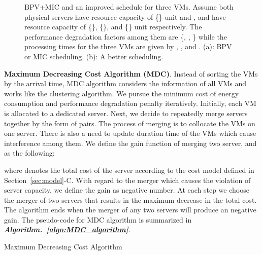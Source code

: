 \documentclass[10pt,journal]{IEEEtran}
\begin{document}
\begin{figure}
\caption{\label{fig:example_overlapping}BPV+MIC and an improved schedule for three VMs. Assume both physical servers have resource capacity of \{\} unit and ,  and  have resource capacity of \{\}, \{\}, and \{\} unit respectively. The performance degradation factors among them are \{, , \} while the processing times for the three VMs are given by , , and . (a): BPV or MIC scheduling. (b): A better scheduling.}
\end{figure}

\textbf{Maximum Decreasing Cost Algorithm (MDC)}. Instead of sorting the VMs by the arrival time, MDC algorithm considers the information of all VMs and works like the clustering algorithm. We pursue the minimum cost of energy consumption and performance degradation penalty iteratively. Initially, each VM is allocated to a dedicated server. Next, we decide to repeatedly merge servers together by the form of pairs. The process of merging is to collocate the VMs on one server. There is also a need to update duration time of the VMs which cause interference among them. We define the gain function of merging two server,  and  as the following:

where  denotes the total cost of the server according to the cost model defined in Section~\ref{sec:model}-C. With regard to the merger which causes the violation of server capacity, we define the gain as negative number. At each step we choose the merger of two servers that results in the maximum decrease in the total cost. The algorithm ends when the merger of any two servers will produce an negative gain. The pseudo-code for MDC algorithm is summarized in \textbf{\textit{Algorithm.~\ref{algo:MDC_algorithm}}}.
\begin{algorithm}
\caption{\label{algo:MDC_algorithm}Maximum Decreasing Cost Algorithm}
\end{algorithm}
\end{document}

